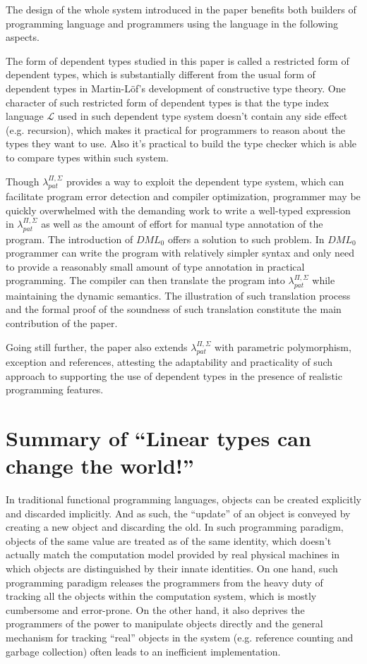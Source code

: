 \documentclass{llncs}
\newcommand{\dmlL}{$\mathcal{L}$}
\newcommand{\dmllamall}{$\lambda_{pat}^{\Pi,\Sigma}$}
\newcommand{\dmlzero}{$DML_0$}
\begin{document}
The design of the whole system introduced in the paper benefits both builders of
programming language and programmers using the language in the following
aspects.

The form of dependent
types studied in this paper is called a restricted form of dependent types,
which is substantially different from the usual form of dependent types in
Martin-L\"of's development of constructive type theory. One character of such
restricted form of dependent types is that the type index language
\dmlL{} used in such dependent type system doesn't contain any side
effect (e.g. recursion), which makes it practical for
programmers to reason about the types they want to use. Also it's practical
to build the type checker which is able to compare types within such system.

Though \dmllamall{} provides a way to exploit the dependent type system, 
which can facilitate program error detection and
compiler optimization, programmer may be quickly overwhelmed with the
demanding work to write a well-typed expression in \dmllamall{} as well as the
amount of effort for manual type annotation of the program. The introduction
of \dmlzero{} offers a solution to such problem. In \dmlzero{} programmer can write the
program with relatively simpler syntax and only need to provide a reasonably
small amount of type annotation in practical programming. The compiler can
then translate the program into \dmllamall{} while maintaining the dynamic
semantics. The illustration of such translation process and the formal proof
of the soundness of such translation constitute the main contribution of
the paper.

Going still further, the paper also extends \dmllamall{} with 
parametric polymorphism, exception
and references, attesting the adaptability and practicality of such approach
to supporting the use of dependent types in the presence of realistic
programming features.


\newpage
\section{Summary of ``Linear types can change the world!''\cite{Wadler1990Linear}}
  \label{section:lineartypes}

In traditional functional programming languages, objects can be created explicitly
and discarded implicitly. And as such, the ``update'' of an object is conveyed by
creating a new object and discarding the old. In such programming paradigm,
objects of the same value are treated as of the same identity, 
which doesn't actually match the computation model provided by real
physical machines in which objects are distinguished by their innate identities.
On one hand, such programming paradigm releases the programmers from the heavy duty of
tracking all the objects within the computation system, which is mostly
cumbersome and error-prone. On the other hand, it also deprives the
programmers of the power to manipulate objects directly and the general
mechanism for tracking ``real'' objects in the system (e.g. reference counting and garbage
collection) often leads to an inefficient implementation.
\end{document}
